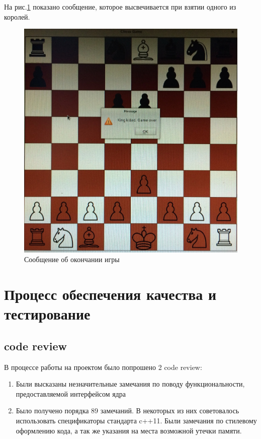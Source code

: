 На рис.\ref{pic:GUIgameOverMessege} показано сообщение, которое высвечивается при взятии одного из королей.\\
\begin{figure}[H]
	\begin{center}
		\includegraphics[scale=0.1]{pics/gui1.jpg}
		\caption{Сообщение об окончании игры} 
		\label{pic:GUIgameOverMessege} %
	\end{center}
\end{figure}


\section*{Процесс обеспечения качества и тестирование}

\subsection*{code review}
В процессе работы на проектом было попрошено 2 code review:
\begin{enumerate}
\item Были высказаны незначительные замечания по поводу функциональности, предоставляемой интерфейсом ядра
\item Было получено порядка 89 замечаний. В некоторых из них советовалось использовать спецификаторы стандарта c++11. Были замечания по стилевому оформлению кода, а так же указания на места возможной утечки памяти.
\end{enumerate}

